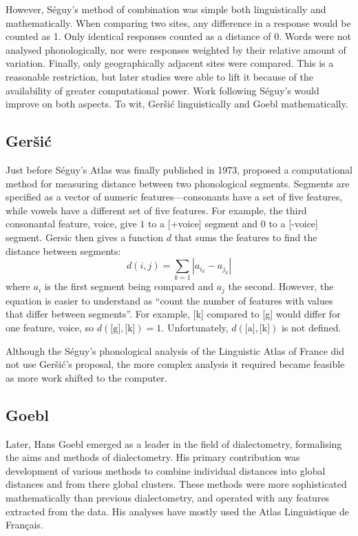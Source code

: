 \documentclass[11pt]{article}
\begin{document}
However, S\'eguy's method of combination was simple both
linguistically and mathematically. When comparing two sites, any
difference in a response would be counted as 1. Only identical
responses counted as a distance of 0. Words were not analysed
phonologically, nor were responses weighted by their relative amount
of variation. Finally, only geographically adjacent sites were
compared. This is a reasonable restriction, but later studies were
able to lift it because of the availability of greater computational
power. Work following S\'eguy's would improve on both aspects. To wit,
Ger\v{s}i\'c linguistically and Goebl mathematically.

\subsection{Ger\v{s}i\'c}
Just before S\'eguy's Atlas was finally published in 1973,
 proposed a computational method for measuring
distance between two phonological segments. Segments are specified as
a vector of numeric features---consonants have a set of five features,
while vowels have a different set of five features.  For example, the
third consonantal feature, voice, give $1$ to a [+voice] segment and
$0$ to a [-voice] segment. Gersic then gives a function $d$ that sums
the features to find the distance between segments:
\[ d(i,j) = \sum_{k=1} |a_{i_k} - a_{j_k}|\] where $a_i$ is the first
segment being compared and $a_j$ the second. However, the equation is
easier to understand as ``count the
number of features with values that differ between segments''. For
example, [k] compared to [g] would differ for one feature, voice, so
$d(\textrm{[g]},\textrm{[k]}) = 1$. Unfortunately, $d(\textrm{[a]},
\textrm{[k]})$ is not defined.

Although the S\'eguy's phonological analysis of the Linguistic Atlas
of France did not use Ger\v{s}i\'c's proposal, the more complex
analysis it required became feasible as more work shifted to the computer.

\subsection{Goebl}

Later, Hans Goebl emerged as a leader in the field of dialectometry,
formalising the aims and methods of dialectometry. His primary
contribution was development of various methods to combine individual
distances into global distances and from there global clusters. These
methods were more sophisticated mathematically than previous
dialectometry, and operated with any features extracted from the data. His
analyses have mostly used the Atlas Linguistique de Fran\c{c}ais.
\end{document}
